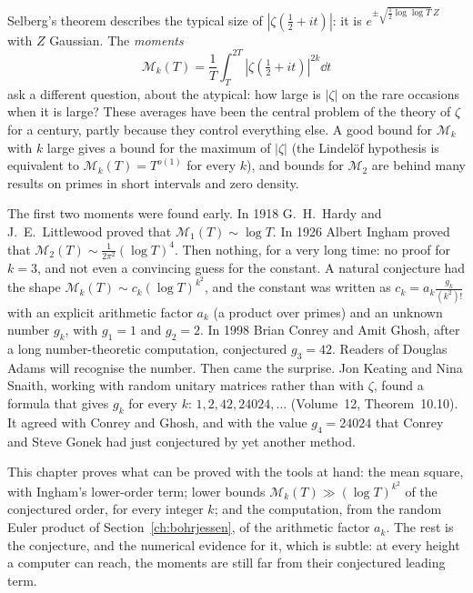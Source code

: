 Selberg's theorem describes the typical size of $|\zeta(\frac12+it)|$: it is $e^{\pm\sqrt{\frac12\log\log T}\,Z}$ with $Z$ Gaussian. The \emph{moments}
\[
\mathcal M_k(T)=\frac1T\int_T^{2T}|\zeta(\tfrac12+it)|^{2k}\dd t
\]
ask a different question, about the atypical: how large is $|\zeta|$ on the rare occasions when it is large? These averages have been the central problem of the theory of $\zeta$ for a century, partly because they control everything else. A good bound for $\mathcal M_k$ with $k$ large gives a bound for the maximum of $|\zeta|$ (the Lindelöf hypothesis is equivalent to $\mathcal M_k(T)=T^{o(1)}$ for every $k$), and bounds for $\mathcal M_2$ are behind many results on primes in short intervals and zero density.

The first two moments were found early. In 1918 G.~H.~Hardy and J.~E.~Littlewood proved that $\mathcal M_1(T)\sim\log T$. In 1926 Albert Ingham proved that $\mathcal M_2(T)\sim\frac1{2\pi^2}(\log T)^4$. Then nothing, for a very long time: no proof for $k=3$, and not even a convincing guess for the constant. A natural conjecture had the shape $\mathcal M_k(T)\sim c_k(\log T)^{k^2}$, and the constant was written as $c_k=a_k\frac{g_k}{(k^2)!}$ with an explicit arithmetic factor $a_k$ (a product over primes) and an unknown number $g_k$, with $g_1=1$ and $g_2=2$. In 1998 Brian Conrey and Amit Ghosh, after a long number-theoretic computation, conjectured $g_3=42$. Readers of Douglas Adams will recognise the number. Then came the surprise. Jon Keating and Nina Snaith, working with random unitary matrices rather than with $\zeta$, found a formula that gives $g_k$ for every $k$: $1,2,42,24024,\dots$ (Volume~12, Theorem~10.10). It agreed with Conrey and Ghosh, and with the value $g_4=24024$ that Conrey and Steve Gonek had just conjectured by yet another method.

This chapter proves what can be proved with the tools at hand: the mean square, with Ingham's lower-order term; lower bounds $\mathcal M_k(T)\gg(\log T)^{k^2}$ of the conjectured order, for every integer $k$; and the computation, from the random Euler product of Section~\ref{ch:bohrjessen}, of the arithmetic factor $a_k$. The rest is the conjecture, and the numerical evidence for it, which is subtle: at every height a computer can reach, the moments are still far from their conjectured leading term.

